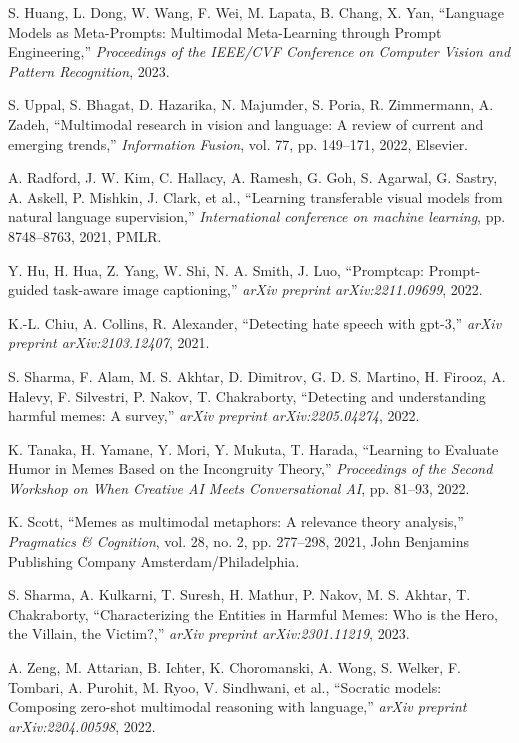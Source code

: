 \documentclass[conference]{IEEEtran}
\begin{document}
\begin{thebibliography}{00}
S. Huang, L. Dong, W. Wang, F. Wei, M. Lapata, B. Chang, X. Yan, ``Language Models as Meta-Prompts: Multimodal Meta-Learning through Prompt Engineering,'' \emph{Proceedings of the IEEE/CVF Conference on Computer Vision and Pattern Recognition}, 2023.

S. Uppal, S. Bhagat, D. Hazarika, N. Majumder, S. Poria, R. Zimmermann, A. Zadeh, ``Multimodal research in vision and language: A review of current and emerging trends,'' \emph{Information Fusion}, vol. 77, pp. 149--171, 2022, Elsevier.

A. Radford, J. W. Kim, C. Hallacy, A. Ramesh, G. Goh, S. Agarwal, G. Sastry, A. Askell, P. Mishkin, J. Clark, et al., ``Learning transferable visual models from natural language supervision,'' \emph{International conference on machine learning}, pp. 8748--8763, 2021, PMLR.


Y. Hu, H. Hua, Z. Yang, W. Shi, N. A. Smith, J. Luo, ``Promptcap: Prompt-guided task-aware image captioning,'' \emph{arXiv preprint arXiv:2211.09699}, 2022.

K.-L. Chiu, A. Collins, R. Alexander, ``Detecting hate speech with gpt-3,'' \emph{arXiv preprint arXiv:2103.12407}, 2021.

S. Sharma, F. Alam, M. S. Akhtar, D. Dimitrov, G. D. S. Martino, H. Firooz, A. Halevy, F. Silvestri, P. Nakov, T. Chakraborty, ``Detecting and understanding harmful memes: A survey,'' \emph{arXiv preprint arXiv:2205.04274}, 2022.


K. Tanaka, H. Yamane, Y. Mori, Y. Mukuta, T. Harada, ``Learning to Evaluate Humor in Memes Based on the Incongruity Theory,'' \emph{Proceedings of the Second Workshop on When Creative AI Meets Conversational AI}, pp. 81--93, 2022.

K. Scott, ``Memes as multimodal metaphors: A relevance theory analysis,'' \emph{Pragmatics \& Cognition}, vol. 28, no. 2, pp. 277--298, 2021, John Benjamins Publishing Company Amsterdam/Philadelphia.

S. Sharma, A. Kulkarni, T. Suresh, H. Mathur, P. Nakov, M. S. Akhtar, T. Chakraborty, ``Characterizing the Entities in Harmful Memes: Who is the Hero, the Villain, the Victim?,'' \emph{arXiv preprint arXiv:2301.11219}, 2023.

A. Zeng, M. Attarian, B. Ichter, K. Choromanski, A. Wong, S. Welker, F. Tombari, A. Purohit, M. Ryoo, V. Sindhwani, et al., ``Socratic models: Composing zero-shot multimodal reasoning with language,'' \emph{arXiv preprint arXiv:2204.00598}, 2022.


\end{thebibliography}
\end{document}
